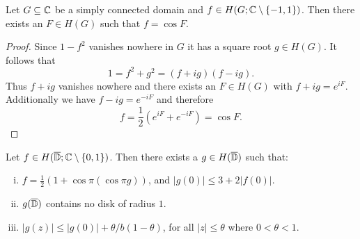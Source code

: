 \begin{lemma} \label{lem:schottky-2}
    Let $G \subseteq \mathbb{C}$ be a simply connected domain and $f \in H(G; \mathbb{C} \setminus \{ -1, 1 \})$. Then there exists an $F \in H(G)$ such that $f = \cos F$.
\end{lemma}

\begin{proof}
    Since $1 - f^2$ vanishes nowhere in $G$ it has a square root $g \in H(G)$. It follows that
    $$ 1 = f^2 + g^2 = (f + ig)(f - ig). $$
    Thus $f + ig$ vanishes nowhere and there exists an $F \in H(G)$ with $f + ig = e^{iF}$. Additionally we have $f - ig = e^{-iF}$ and therefore
    $$ f = {\textstyle \frac{1}{2}} (e^{iF} + e^{-iF}) = \cos F. $$
\end{proof}

\begin{lemma} \label{lem:schottky-3}
    Let $f \in H(\overline{\mathbb{D}}; \mathbb{C} \setminus \{ 0, 1 \})$. Then there exists a $g \in H(\overline{\mathbb{D}})$ such that:
    \begin{enumerate}[i.]
        \item $f = \frac{1}{2} ( 1 + \cos \pi (\cos \pi g))$, and $\vert g(0) \vert \leq 3 + 2 \vert f(0) \vert$.
        \item $g(\overline{\mathbb{D}})$ contains no disk of radius $1$.
        \item $\vert g(z) \vert \leq \vert g(0) \vert + \theta / b (1 - \theta)$, for all $\vert z \vert \leq \theta$ where $0 < \theta < 1$.
    \end{enumerate}
\end{lemma}

